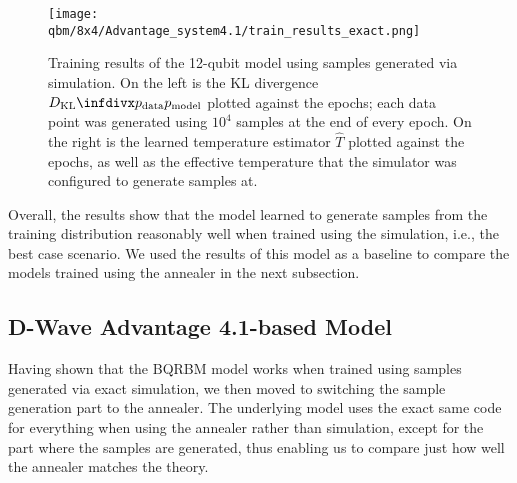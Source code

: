 \begin{figure}[!htb]
    \begin{center}
        \texttt{[image: qbm/8x4/Advantage\_system4.1/train\_results\_exact.png]}
    \end{center}
    \caption{
        Training results of the 12-qubit model using samples generated via simulation.
        On the left is the KL divergence \( \DKL{\pdata}{\pmodel} \) plotted against the epochs; each data point was generated using \( 10^4 \) samples at the end of every epoch.
        On the right is the learned temperature estimator \( \hat{T} \) plotted against the epochs, as well as the effective temperature that the simulator was configured to generate samples at.
    }
    \label{fig:train_results_exact}
\end{figure}

Overall, the results show that the model learned to generate samples from the training distribution reasonably well when trained using the simulation, i.e., the best case scenario.
We used the results of this model as a baseline to compare the models trained using the annealer in the next subsection.

\subsection{D-Wave Advantage 4.1-based Model}
Having shown that the BQRBM model works when trained using samples generated via exact simulation, we then moved to switching the sample generation part to the annealer.
The underlying model uses the exact same code for everything when using the annealer rather than simulation, except for the part where the samples are generated, thus enabling us to compare just how well the annealer matches the theory.

